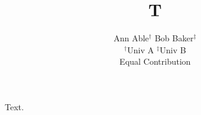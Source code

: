 \documentclass{article}
\title{T}
\author{Ann Able$^{\dagger}$ \quad Bob Baker$^{\ddagger}$ \\ $^\dagger$Univ A \quad $^\ddagger$Univ B \\ Equal Contribution}
\begin{document}
\maketitle
Text.
\end{document}

